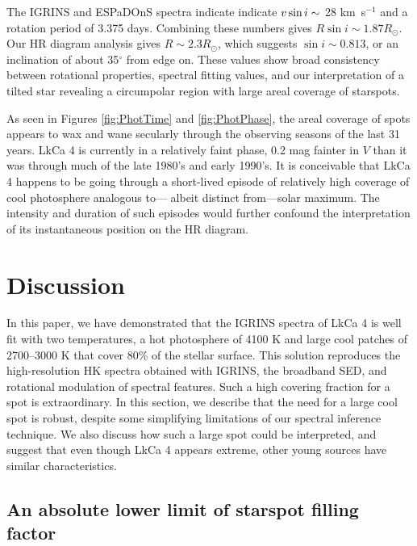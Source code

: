\documentclass[twocolumn]{emulateapj}%
\begin{document}
The IGRINS and ESPaDOnS spectra indicate indicate $v \sin i\sim$ 28 km~s$^{-1}$ and a rotation period of 3.375 days. Combining these numbers gives $R\sin{i} \sim 1.87 R_{\odot}$. Our HR diagram analysis gives $R \sim 2.3R_{\odot}$, which suggests  $\sin{i} \sim 0.813$, or an inclination of about 35$^{\circ}$ from edge on. These values show broad consistency between rotational properties, spectral fitting values, and our interpretation of a tilted star revealing a circumpolar region with large areal coverage of starspots.

As seen in Figures \ref{fig:PhotTime} and \ref{fig:PhotPhase}, the areal coverage of spots appears to wax and wane secularly through the observing seasons of the last 31 years.  LkCa 4 is currently in a relatively faint phase, 0.2 mag fainter in $V$ than it was through much of the late 1980's and early 1990's.  It is conceivable that LkCa 4 happens to be going through a short-lived episode of relatively high coverage of cool photosphere analogous to--- albeit distinct from---solar maximum.  The intensity and duration of such episodes would further confound the interpretation of its instantaneous position on the HR diagram.


\section{Discussion}


In this paper, we have demonstrated that the IGRINS spectra of LkCa 4 is well fit with two temperatures, a hot photosphere of 4100 K and large cool patches of 2700--3000 K that cover 80\% of the stellar surface.  This solution reproduces the high-resolution HK spectra obtained with IGRINS, the broadband SED, and rotational modulation of spectral features.  Such a high covering fraction for a spot is extraordinary.  In this section, we describe that the need for a large cool spot is robust, despite some simplifying limitations of our spectral inference technique.  We also discuss how such a large spot could be interpreted, and suggest that even though LkCa 4 appears extreme, other young sources have similar characteristics.


\subsection{An absolute lower limit of starspot filling factor} 
\end{document}
